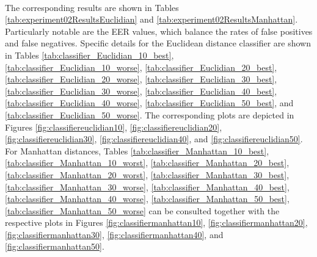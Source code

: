 \\
\par The corresponding results are shown in Tables \ref{tab:experiment02ResultsEuclidian} and \ref{tab:experiment02ResultsManhattan}. Particularly notable are the EER values, which balance the rates of false positives and false negatives. Specific details for the Euclidean distance classifier are shown in Tables \ref{tab:classifier_Euclidian_10_best}, \ref{tab:classifier_Euclidian_10_worse},
		\ref{tab:classifier_Euclidian_20_best}, \ref{tab:classifier_Euclidian_20_worse}, 
		\ref{tab:classifier_Euclidian_30_best}, \ref{tab:classifier_Euclidian_30_worse}, 
		\ref{tab:classifier_Euclidian_40_best}, \ref{tab:classifier_Euclidian_40_worse}, 
		\ref{tab:classifier_Euclidian_50_best},  and \ref{tab:classifier_Euclidian_50_worse}. The corresponding plots are depicted in Figures \ref{fig:classifiereuclidian10}, \ref{fig:classifiereuclidian20}, \ref{fig:classifiereuclidian30}, \ref{fig:classifiereuclidian40}, and \ref{fig:classifiereuclidian50}. For Manhattan distances,  Tables \ref{tab:classifier_Manhattan_10_best}, \ref{tab:classifier_Manhattan_10_worst}, 
		\ref{tab:classifier_Manhattan_20_best}, \ref{tab:classifier_Manhattan_20_worst}, 
		\ref{tab:classifier_Manhattan_30_best}, \ref{tab:classifier_Manhattan_30_worse}, 
		\ref{tab:classifier_Manhattan_40_best}, \ref{tab:classifier_Manhattan_40_worse}, 
		\ref{tab:classifier_Manhattan_50_best},
		\ref{tab:classifier_Manhattan_50_worse} 
		can be consulted together with the respective plots in Figures \ref{fig:classifiermanhattan10}, \ref{fig:classifiermanhattan20}, \ref{fig:classifiermanhattan30}, \ref{fig:classifiermanhattan40}, and \ref{fig:classifiermanhattan50}.











